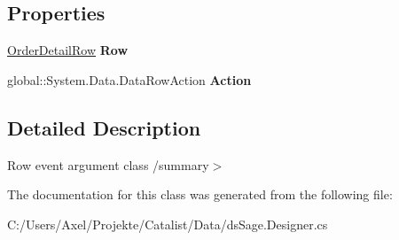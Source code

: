 \subsection*{Properties}
\begin{DoxyCompactItemize}
\item 
\hyperlink{class_products_1_1_data_1_1ds_sage_1_1_order_detail_row}{Order\+Detail\+Row} {\bfseries Row}\hypertarget{class_products_1_1_data_1_1ds_sage_1_1_order_detail_row_change_event_a6387d07b35be720bbd8eeffe71b504ec}{}\label{class_products_1_1_data_1_1ds_sage_1_1_order_detail_row_change_event_a6387d07b35be720bbd8eeffe71b504ec}

\item 
global\+::\+System.\+Data.\+Data\+Row\+Action {\bfseries Action}\hypertarget{class_products_1_1_data_1_1ds_sage_1_1_order_detail_row_change_event_a01e475dc8de7b2498f080f52f88f3805}{}\label{class_products_1_1_data_1_1ds_sage_1_1_order_detail_row_change_event_a01e475dc8de7b2498f080f52f88f3805}

\end{DoxyCompactItemize}


\subsection{Detailed Description}
Row event argument class /summary$>$ 

The documentation for this class was generated from the following file\+:\begin{DoxyCompactItemize}
\item 
C\+:/\+Users/\+Axel/\+Projekte/\+Catalist/\+Data/ds\+Sage.\+Designer.\+cs\end{DoxyCompactItemize}
